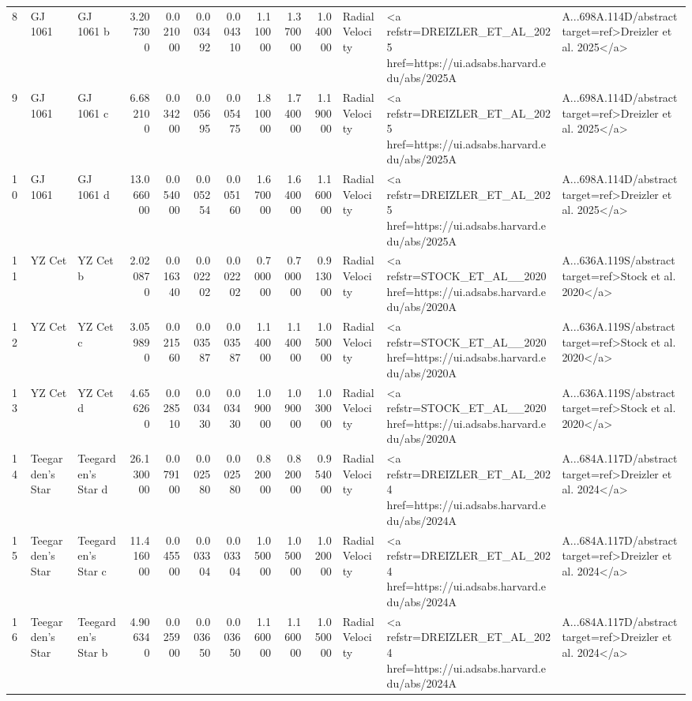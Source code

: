 \begin{tabular}{lllrrrrrrrll}
8 & GJ 1061 & GJ 1061 b & 3.207300 & 0.021000 & 0.003492 & 0.004310 & 1.110000 & 1.370000 & 1.040000 & Radial Velocity & <a refstr=DREIZLER_ET_AL_2025 href=https://ui.adsabs.harvard.edu/abs/2025A&A...698A.114D/abstract target=ref>Dreizler et al. 2025</a> \\
9 & GJ 1061 & GJ 1061 c & 6.682100 & 0.034200 & 0.005695 & 0.005475 & 1.810000 & 1.740000 & 1.190000 & Radial Velocity & <a refstr=DREIZLER_ET_AL_2025 href=https://ui.adsabs.harvard.edu/abs/2025A&A...698A.114D/abstract target=ref>Dreizler et al. 2025</a> \\
10 & GJ 1061 & GJ 1061 d & 13.066000 & 0.054000 & 0.005254 & 0.005160 & 1.670000 & 1.640000 & 1.160000 & Radial Velocity & <a refstr=DREIZLER_ET_AL_2025 href=https://ui.adsabs.harvard.edu/abs/2025A&A...698A.114D/abstract target=ref>Dreizler et al. 2025</a> \\
11 & YZ Cet & YZ Cet b & 2.020870 & 0.016340 & 0.002202 & 0.002202 & 0.700000 & 0.700000 & 0.913000 & Radial Velocity & <a refstr=STOCK_ET_AL__2020 href=https://ui.adsabs.harvard.edu/abs/2020A&A...636A.119S/abstract target=ref>Stock et al. 2020</a> \\
12 & YZ Cet & YZ Cet c & 3.059890 & 0.021560 & 0.003587 & 0.003587 & 1.140000 & 1.140000 & 1.050000 & Radial Velocity & <a refstr=STOCK_ET_AL__2020 href=https://ui.adsabs.harvard.edu/abs/2020A&A...636A.119S/abstract target=ref>Stock et al. 2020</a> \\
13 & YZ Cet & YZ Cet d & 4.656260 & 0.028510 & 0.003430 & 0.003430 & 1.090000 & 1.090000 & 1.030000 & Radial Velocity & <a refstr=STOCK_ET_AL__2020 href=https://ui.adsabs.harvard.edu/abs/2020A&A...636A.119S/abstract target=ref>Stock et al. 2020</a> \\
14 & Teegarden's Star & Teegarden's Star d & 26.130000 & 0.079100 & 0.002580 & 0.002580 & 0.820000 & 0.820000 & 0.954000 & Radial Velocity & <a refstr=DREIZLER_ET_AL_2024 href=https://ui.adsabs.harvard.edu/abs/2024A&A...684A.117D/abstract target=ref>Dreizler et al. 2024</a> \\
15 & Teegarden's Star & Teegarden's Star c & 11.416000 & 0.045500 & 0.003304 & 0.003304 & 1.050000 & 1.050000 & 1.020000 & Radial Velocity & <a refstr=DREIZLER_ET_AL_2024 href=https://ui.adsabs.harvard.edu/abs/2024A&A...684A.117D/abstract target=ref>Dreizler et al. 2024</a> \\
16 & Teegarden's Star & Teegarden's Star b & 4.906340 & 0.025900 & 0.003650 & 0.003650 & 1.160000 & 1.160000 & 1.050000 & Radial Velocity & <a refstr=DREIZLER_ET_AL_2024 href=https://ui.adsabs.harvard.edu/abs/2024A&A...684A.117D/abstract target=ref>Dreizler et al. 2024</a> \\

\end{tabular}

